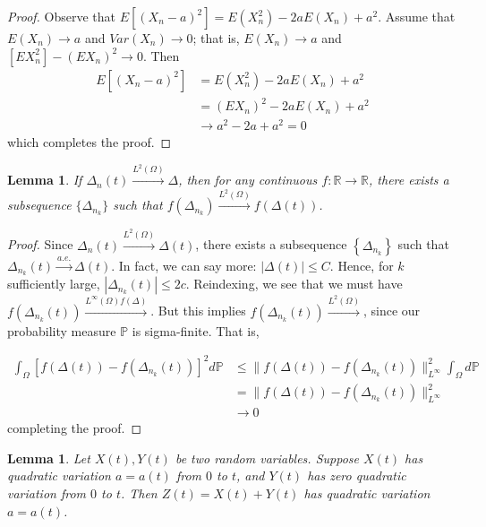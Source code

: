 \documentclass[12pt,reqno]{amsart}
\numberwithin{equation}{section}  %
\newcommand{\rr}{\mathbb{R}}
\newtheorem{lemma}[theorem]{Lemma}
\begin{document}
\begin{proof}
Observe that $E[(X_{n}- a )^{2}] = E(X_{n}^{2}) - 2aE(X_{n}) + a^{2}$. Assume that $E(X_{n}) \to a$ and $Var(X_{n}) \to 0$; that is, $E(X_{n}) \to a$ and $[EX_{n}^{2}] - (E X_{n})^{2} \to 0$. Then
\begin{equation*}
\begin{split}
  E[(X_{n} - a)^{2}] & = E(X_{n}^{2}) - 2aE(X_{n}) + a^{2}
  \\
  & = (EX_{n})^{2} - 2a E(X_{n}) + a^{2}
  \\
  & \to a^{2} - 2a +  a^{2} = 0 
\end{split}
\end{equation*}
which completes the proof.
\end{proof}

\begin{lemma}
If $\Delta_{n}(t) \xrightarrow{L^{2}(\Omega)} \Delta$, then for any continuous $f: \rr \to \rr$, there exists a subsequence $\{ \Delta_{n_{k}} \}$ such that $f(\Delta_{n_{k}}) \xrightarrow{L^{2}(\Omega)} f(\Delta(t))$.
\label{lem:}
\end{lemma}
\begin{proof}
Since $\Delta_{n}(t) \xrightarrow{L^{2}(\Omega)} \Delta(t)$, there exists a subsequence $\left \{ \Delta_{n_{k}} \right \}$ such that $\Delta_{n_{k}}(t) \xrightarrow{a.e.} \Delta(t)$. In fact, we can say more: $| \Delta(t) | \le C$. Hence, for $k$ sufficiently large, $| \Delta_{n_{k}}(t) | \le 2c$. Reindexing, we see that we must have $f(\Delta_{n_{k}}(t)) \xrightarrow{L^{\infty}(\Omega) f(\Delta)}$. But this implies $f(\Delta_{n_{k}}(t)) \xrightarrow{L^{2}(\Omega)}$, since our probability measure $\mathbb{P}$ is sigma-finite. That is,

\begin{equation*}
\begin{split}
  \int_{\Omega} [f(\Delta(t)) - f(\Delta_{n_{k}}(t))]^{2} d \mathbb{P} 
  & \le \| f(\Delta(t)) - f(\Delta_{n_{k}}(t)) \|^{2}_{L^{\infty}} \int_{\Omega} d \mathbb{P}
  \\
  & =  \| f(\Delta(t)) - f(\Delta_{n_{k}}(t)) \|^{2}_{L^{\infty}}
  \\
  & \to 0
\end{split}
\end{equation*}
completing the proof.
\end{proof}

\begin{lemma}
Let $X(t), Y(t)$ be two random variables. Suppose $X(t)$ has quadratic variation $a=a(t)$ from $0$ to $t$, and $Y(t)$ has zero quadratic variation from $0$ to $t$. Then $Z(t) = X(t) + Y(t)$ has quadratic variation $a = a(t)$.
\label{lem:}
\end{lemma}
\end{document}
